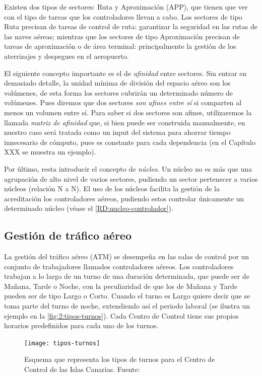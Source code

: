 Existen dos tipos de sectores: Ruta y Aproximación (APP), que tienen que ver con el tipo de tareas que los 
controladores llevan a cabo.
Los sectores de tipo Ruta precisan de tareas de control de ruta: garantizar la seguridad en las rutas de las naves aéreas; mientras que los sectores de tipo Aproximación precisan de tareas de aproximación o de área terminal: principalmente la gestión de los aterrizajes y despegues en el aeropuerto.

El siguiente concepto importante es el de \textit{afinidad} entre sectores. Sin entrar en demasiado detalle, la unidad mínima de división del espacio aéreo son los volúmenes, de esta forma los sectores cubrirán un determinado número de volúmenes.
Pues diremos que dos sectores \textit{son afines entre sí} si comparten al menos un volumen entre sí. Para saber si dos sectores son afines, utilizaremos la llamada \textit{matriz de afinidad} que, si bien puede ser construida manualmente, en nuestro caso será tratada como un input del sistema para ahorrar tiempo innecesario de cómputo, pues es constante para cada dependencia (en el Capítulo XXX se muestra un ejemplo). %

Por último, resta introducir el concepto de \textit{núcleo}. Un núcleo no es más que una agrupación de alto nivel de varios sectores, pudiendo un sector pertenecer a varios núcleos (relación N a N). El uso de los núcleos facilita la gestión de la acreditación los controladores aéreos, pudiendo estos controlar únicamente un determinado núcleo (véase el \ref{RD:nucleo-controlador}).


\subsection{Gestión de tráfico aéreo}
La gestión del tráfico aéreo (\gls{ATM}) se desempeña en las salas de control por un conjunto de trabajadores 
llamados controladores aéreos. Los controladores trabajan a lo largo de un turno de una duración determinada, que puede ser de Mañana, Tarde o Noche, con la peculiaridad de que los de Mañana y Tarde pueden ser de tipo Largo o Corto. 
Cuando el turno es Largo quiere decir que se toma parte del turno de noche, extendiendo así el periodo laboral (se ilustra un ejemplo en la \autoref{fig:2:tipos-turnos}). Cada \acrlong{Centro de Control} tiene sus propios horarios predefinidos para cada uno de los turnos.

\begin{figure}
	\centering
	\texttt{[image: tipos-turnos]}
	\caption[Esquema que representa los tipos de turnos]{Esquema que representa los tipos de turnos para el \acrlong{Centro de Control} de las Islas Canarias. 
	Fuente:~\cite{articulo1}}
	\label{fig:2:tipos-turnos}
\end{figure}

